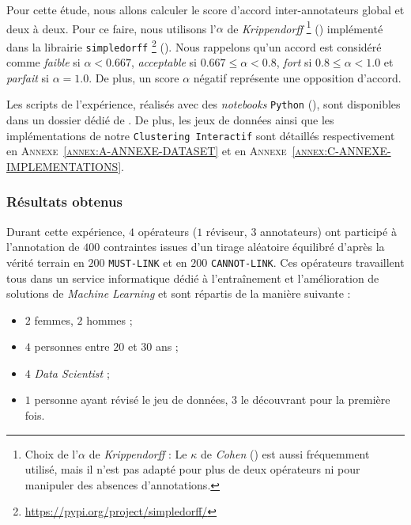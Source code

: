 			Pour cette étude, nous allons calculer le score d'accord inter-annotateurs global et deux à deux.
			Pour ce faire, nous utilisons l'$\alpha$ de \textit{Krippendorff} \footnote{
				Choix de l'$\alpha$ de \textit{Krippendorff} : Le $\kappa$ de \textit{Cohen} (\cite{landis-koch:1977:measurement-observer-agreement}) est aussi fréquemment utilisé, mais il n'est pas adapté pour plus de deux opérateurs ni pour manipuler des absences d'annotations.
			} (\cite{krippendorff:2004:content-analysis-introduction}) implémenté dans la librairie \texttt{simpledorff} \footnote{
				\url{https://pypi.org/project/simpledorff/}
			} (\cite{perry:2021:lighttag-text-annotation}).
			Nous rappelons qu'un accord est considéré comme \textit{faible} si $\alpha<0.667$, \textit{acceptable} si $0.667 \leq \alpha<0.8$, \textit{fort} si $0.8 \leq \alpha<1.0$ et \textit{parfait} si $\alpha = 1.0$.
			De plus, un score $\alpha$ négatif représente une opposition d'accord.
			
			\begin{leftBarInformation}
				Les scripts de l'expérience, réalisés avec des \textit{notebooks} \texttt{Python} (\cite{van-rossum-drake:2009:python-reference-manual}), sont disponibles dans un dossier dédié de \cite{schild:2021:cognitivefactory-interactiveclusteringcomparativestudy}.
				De plus, les jeux de données ainsi que les implémentations de notre \texttt{Clustering Interactif} sont détaillés respectivement en \textsc{Annexe~\ref{annex:A-ANNEXE-DATASET}} et en \textsc{Annexe~\ref{annex:C-ANNEXE-IMPLEMENTATIONS}}.
			\end{leftBarInformation}
			
		\subsubsection{Résultats obtenus}
		
			Durant cette expérience, $4$ opérateurs ($1$ réviseur, $3$ annotateurs) ont participé à l'annotation de $400$ contraintes issues d'un tirage aléatoire équilibré d'après la vérité terrain en $200$ \texttt{MUST-LINK} et en $200$ \texttt{CANNOT-LINK}.
			Ces opérateurs travaillent tous dans un service informatique dédié à l'entraînement et l'amélioration de solutions de \textit{Machine Learning} et sont répartis de la manière suivante :
			\begin{itemize}
				\item $2$ femmes, $2$ hommes ;
				\item $4$ personnes entre $20$ et $30$ ans ;
				\item $4$ \textit{Data Scientist} ;
				\item $1$ personne ayant révisé le jeu de données, $3$ le découvrant pour la première fois.
			\end{itemize}
		
